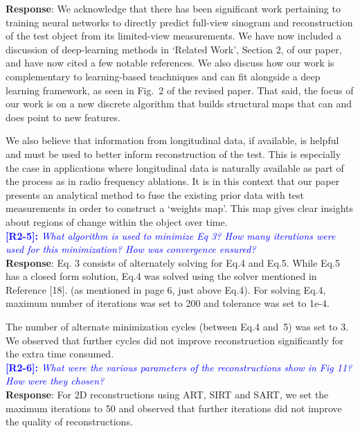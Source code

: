 \documentclass[11pt]{article}
\begin{document}
\textbf{Response}: We acknowledge that there has been significant work
pertaining to training neural networks to directly predict full-view
sinogram and reconstruction of the test object from its limited-view
measurements. We have now included a discussion of deep-learning
methods in `Related Work', Section 2, of our paper, and have now cited
a few notable references. We also discuss how our work is
complementary to learning-based teachniques and can fit alongside a
deep learning framework, as seen in Fig.~2 of the revised paper. That
said, the focus of our work is on a new discrete algorithm that builds
structural maps that can and does point to new features.

We also believe that information from longitudinal data, if available, is helpful and must be used to better inform reconstruction of the test. This is especially the case in applications where longitudinal data is naturally available as part of the process as in radio frequency ablations. It is in this context that our paper presents an analytical method to fuse the existing prior data with test measurements in order to construct a `weights map'. This map gives clear insights about regions of change within the object over time.\\



\vspace{0.5cm}\textcolor{blue}{\textbf{[R2-5]:} \textit{What algorithm is used to minimize Eq 3? How many iterations were used for this minimization? How was convergence ensured?}}\\

\textbf{Response}: Eq. 3 consists of alternately solving for Eq.4 and Eq.5. While Eq.5 has a closed form solution, Eq.4 was solved using the solver mentioned in Reference [18]. (as mentioned in page 6, just above Eq.4). 
For solving Eq.4, maximum number of iterations was set to 200 and tolerance was set to 1e-4.

The number of alternate minimization cycles (between Eq.4 and~5) was set to 3. We observed that further cycles did not improve reconstruction significantly for the extra time consumed.
\\

\vspace{0.5cm}\textcolor{blue}{\textbf{[R2-6]:} \textit{What were the various parameters of the reconstructions show in Fig 11? How were they chosen?
}}\\

\textbf{Response}: For 2D reconstructions using ART, SIRT and SART, we set the maximum iterations to 50 and observed that further iterations did not improve the quality of reconstructions.\\
\end{document}
